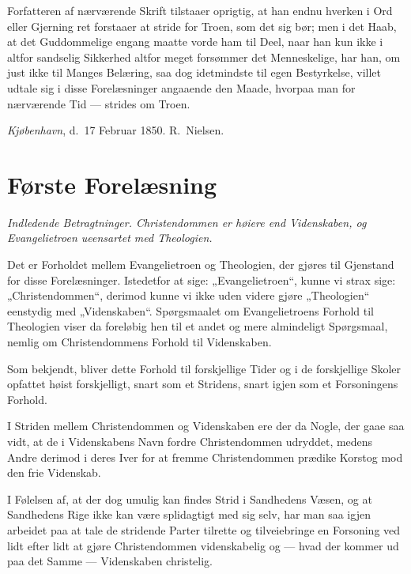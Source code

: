 \documentclass[12pt,a4paper]{book}
\newcommand{\opage}[1]{\marginnote{\footnotesize\textit{[#1]}}}
\begin{document}
Forfatteren af nærværende Skrift tilstaaer oprigtig, at han endnu hverken i Ord
eller Gjerning ret forstaaer at stride for Troen, som det sig bør; men i det
Haab, at det Guddommelige engang maatte vorde ham til Deel, naar han kun ikke i
altfor sandselig Sikkerhed altfor meget forsømmer det Menneskelige, har han, om
just ikke til Manges Belæring, saa dog idetmindste til egen Bestyrkelse, villet
udtale sig i disse Forelæsninger angaaende den Maade, hvorpaa man for
nærværende Tid --- strides om Troen.

\bigskip
\noindent \emph{Kjøbenhavn}, d.\ 17 Februar 1850.
\hfill R.\ Nielsen.

\chapter*{Første Forelæsning}
\label{ch:forel1}

\begin{center}\itshape
Indledende Betragtninger. Christendommen er høiere end Videnskaben,
og Evangelietroen ueensartet med Theologien.
\end{center}

\opage{1} Det er Forholdet mellem Evangelietroen og Theologien, der gjøres til
Gjenstand for disse Forelæsninger. Istedetfor at sige: „Evangelietroen“,
kunne vi strax sige: „Christendommen“, derimod kunne vi ikke uden videre
gjøre „Theologien“ eenstydig med „Videnskaben“. Spørgsmaalet om
Evangelietroens Forhold til Theologien viser da foreløbig hen til et andet
og mere almindeligt Spørgsmaal, nemlig om Christendommens Forhold til
Videnskaben.

Som bekjendt, bliver dette Forhold til forskjellige Tider og i de
forskjellige Skoler opfattet høist forskjelligt, snart som et Stridens,
snart igjen som et Forsoningens Forhold.

I Striden mellem Christendommen og Videnskaben ere der da Nogle, der gaae
saa vidt, at de i Videnskabens Navn fordre Christendommen udryddet, medens
Andre derimod i deres Iver for at fremme Christendommen prædike Korstog
mod den frie Videnskab.

I Følelsen af, at der dog umulig kan findes Strid i Sandhedens Væsen, og
at Sandhedens Rige ikke kan være splidagtigt med sig selv, har man saa
igjen arbeidet paa at tale de stridende
\opage{2} Parter tilrette og tilveiebringe en Forsoning ved lidt efter lidt at gjøre
Christendommen videnskabelig og --- hvad der kommer ud paa det Samme ---
Videnskaben christelig.
\end{document}
